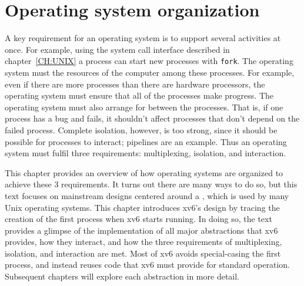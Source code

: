 
\chapter{Operating system organization}
\label{CH:FIRST}

A key requirement for an operating system is to support several activities at once.  For
example, using the system call interface described in
chapter~\ref{CH:UNIX}
a process can start new processes with 
\lstinline{fork}.
The operating system must 
the resources of the computer among these processes.
For example, even if there are more processes
than there are hardware processors, the operating
system must ensure that all of the processes
make progress.  The operating system must also arrange for
between the processes.
That is, if one process has a bug and fails, it shouldn't affect processes that
don't depend on the failed process.
Complete isolation, however, is too strong, since it should be possible for
processes to interact; pipelines are an example.
Thus
an operating system must fulfil three requirements: multiplexing, isolation,
and interaction.

This chapter provides an overview of how operating systems are organized to achieve
these 3 requirements.  It turns out there are many ways to do so, but this text
focuses on mainstream designs centered around a 
, 
which is used by many Unix operating systems.  This chapter 
introduces xv6's design by
tracing the creation of the first process when xv6 starts
running.  In doing so, the text provides a glimpse of the implementation of all
major abstractions that xv6 provides, how they interact, and how the three
requirements of multiplexing, isolation, and interaction are met.  Most of xv6
avoids special-casing the first process, and instead reuses code that xv6 must
provide for standard operation.  Subsequent chapters will explore each
abstraction in more detail.

